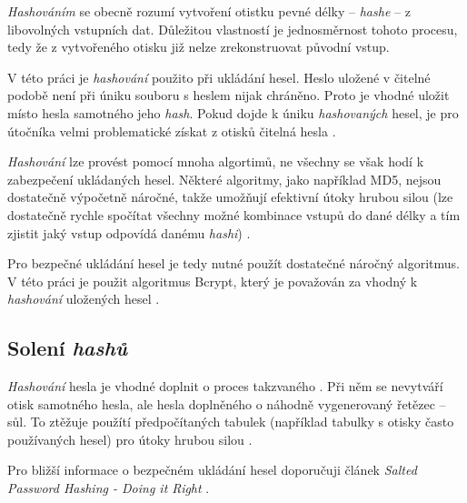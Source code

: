 \textit{Hashováním} se obecně rozumí vytvoření otistku pevné délky -- \textit{hashe} -- z libovolných vstupních dat. Důležitou vlastností je jednosměrnost tohoto procesu, tedy že z vytvořeného otisku již nelze zrekonstruovat původní vstup. \cite{hash_crackstation}

V této práci je \textit{hashování} použito při ukládání hesel. Heslo uložené v čitelné podobě není při úniku souboru s heslem nijak chráněno. Proto je vhodné uložit místo hesla samotného jeho \textit{hash}. Pokud dojde k úniku \textit{hashovaných} hesel, je pro útočníka velmi problematické  získat z otisků čitelná hesla \cite{hash_crackstation}.

\textit{Hashování} lze provést pomocí mnoha algortimů, ne všechny se však hodí k zabezpečení ukládaných hesel. Některé algoritmy, jako například MD5, nejsou dostatečně výpočetně náročné, takže umožňují efektivní útoky hrubou silou (lze dostatečně rychle spočítat všechny možné kombinace vstupů do dané délky a tím zjistit jaký vstup odpovídá danému \textit{hashi}) \cite{hash_crackstation}. 

Pro bezpečné ukládání hesel je tedy nutné použít dostatečné náročný algoritmus. V této práci je použit algoritmus Bcrypt, který je považován za vhodný k \textit{hashování} uložených hesel \cite{hash_crackstation}.

\subsection{Solení \textit{hashů}}

\textit{Hashování} hesla je vhodné doplnit o proces takzvaného . Při něm se nevytváří otisk samotného hesla, ale hesla doplněného o náhodně vygenerovaný řetězec -- sůl. To ztěžuje použítí předpočítaných tabulek (například tabulky s otisky často používaných hesel) pro útoky hrubou silou \cite{hash_crackstation}.

Pro bližší informace o bezpečném ukládání hesel doporučuji článek \textit{Salted Password Hashing - Doing it Right} \cite{hash_crackstation}.
